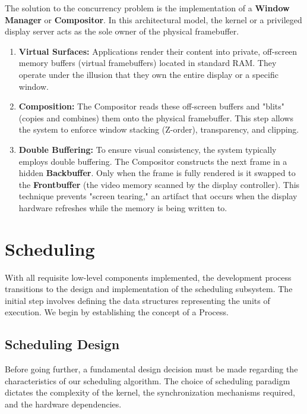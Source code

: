 \documentclass[a4paper,10pt,twoside]{report}
\theoremstyle{definition}
\begin{document}
The solution to the concurrency problem is the implementation of a \textbf{Window Manager} or \textbf{Compositor}. In this architectural model, the kernel or a privileged display server acts as the sole owner of the physical framebuffer.

\begin{enumerate}
    \item \textbf{Virtual Surfaces:} Applications render their content into private, off-screen memory buffers (virtual framebuffers) located in standard RAM. They operate under the illusion that they own the entire display or a specific window.
    \item \textbf{Composition:} The Compositor reads these off-screen buffers and "blits" (copies and combines) them onto the physical framebuffer. This step allows the system to enforce window stacking (Z-order), transparency, and clipping.
    \item \textbf{Double Buffering:} To ensure visual consistency, the system typically employs double buffering. The Compositor constructs the next frame in a hidden \textbf{Backbuffer}. Only when the frame is fully rendered is it swapped to the \textbf{Frontbuffer} (the video memory scanned by the display controller). This technique prevents "screen tearing," an artifact that occurs when the display hardware refreshes while the memory is being written to.
\end{enumerate}

\section{Scheduling}
\label{sec:sched-tutorial}

With all requisite low-level components implemented, the development process transitions to the design and implementation of the scheduling subsystem. The initial step involves defining the data structures representing the units of execution. We begin by establishing the concept of a Process.

\subsection{Scheduling Design}
\label{subsec:scheduling_approaches}

Before going further, a fundamental design decision must be made regarding the characteristics of our scheduling algorithm. The choice of scheduling paradigm dictates the complexity of the kernel, the synchronization mechanisms required, and the hardware dependencies.
\end{document}

